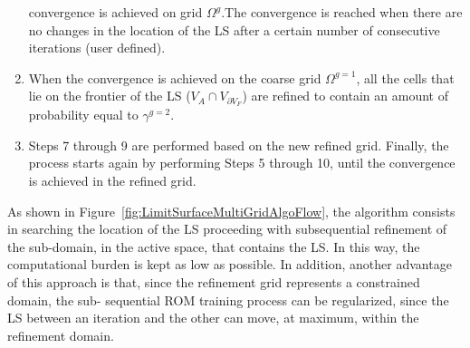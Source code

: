 \begin{enumerate}
     convergence is achieved on grid $\Omega^{g}$.The convergence 
     is reached when there are no changes in the location of the LS 
     after a certain number of consecutive iterations (user defined).
     \item When the convergence is achieved on the coarse grid 
     $\Omega^{g=1}$, all the cells that lie on the frontier of the LS 
     ($V_{A} \cap V_{\partial V_{F}}$) are refined to contain an amount of 
     probability equal to  $\gamma^{g=2}$.
     \item Steps 7 through 9 are performed based on the new refined 
     grid. Finally, the process starts again by performing Steps 5 
     through 10, until the convergence is achieved in the refined grid.
\end{enumerate}
As shown in Figure~\ref{fig:LimitSurfaceMultiGridAlgoFlow}, the 
algorithm consists in searching the location of the LS proceeding with 
subsequential refinement of the sub-domain, in the active space, that 
contains the LS. In this way, the computational burden is kept as low as 
possible. In addition, another advantage of this approach is that, since 
the refinement grid represents a constrained domain, the sub-
sequential ROM training process can be regularized, since the LS 
between an iteration and the other can move, at maximum, within the 
refinement domain.


